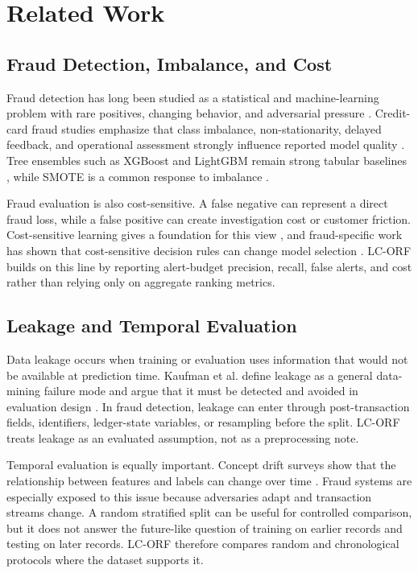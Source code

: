 \documentclass{ieeeaccess}
\begin{document}
\section{Related Work}
\label{sec:related}
\subsection{Fraud Detection, Imbalance, and Cost}
Fraud detection has long been studied as a statistical and machine-learning problem with rare positives, changing behavior, and adversarial pressure \cite{bolton2002fraud}. Credit-card fraud studies emphasize that class imbalance, non-stationarity, delayed feedback, and operational assessment strongly influence reported model quality \cite{dalpozzolo2014lessons,dalpozzolo2015drift,lucas2020survey}. Tree ensembles such as XGBoost and LightGBM remain strong tabular baselines \cite{chen2016xgboost,ke2017lightgbm}, while SMOTE is a common response to imbalance \cite{chawla2002smote}.

Fraud evaluation is also cost-sensitive. A false negative can represent a direct fraud loss, while a false positive can create investigation cost or customer friction. Cost-sensitive learning gives a foundation for this view \cite{elkan2001cost}, and fraud-specific work has shown that cost-sensitive decision rules can change model selection \cite{bahnsen2013cost,bahnsen2016feature}. LC-ORF builds on this line by reporting alert-budget precision, recall, false alerts, and cost rather than relying only on aggregate ranking metrics.

\subsection{Leakage and Temporal Evaluation}
Data leakage occurs when training or evaluation uses information that would not be available at prediction time. Kaufman et al. define leakage as a general data-mining failure mode and argue that it must be detected and avoided in evaluation design \cite{kaufman2012leakage}. In fraud detection, leakage can enter through post-transaction fields, identifiers, ledger-state variables, or resampling before the split. LC-ORF treats leakage as an evaluated assumption, not as a preprocessing note.

Temporal evaluation is equally important. Concept drift surveys show that the relationship between features and labels can change over time \cite{gama2014drift}. Fraud systems are especially exposed to this issue because adversaries adapt and transaction streams change. A random stratified split can be useful for controlled comparison, but it does not answer the future-like question of training on earlier records and testing on later records. LC-ORF therefore compares random and chronological protocols where the dataset supports it.
\end{document}
